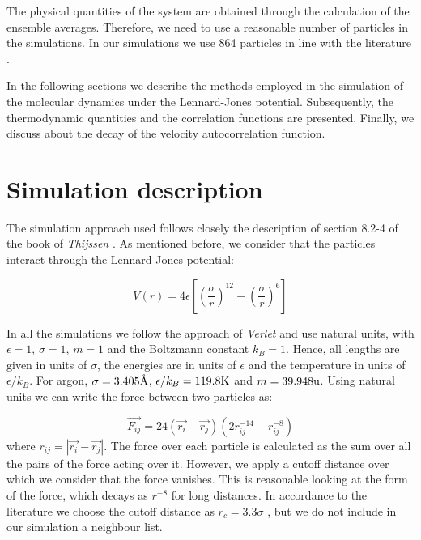 \documentclass[aps,prl,reprint,groupedaddress]{revtex4-1}
\begin{document}
The physical quantities of the system are obtained through the calculation of the ensemble averages. Therefore, we need to use a reasonable number of particles in the simulations. In our simulations we use 864 particles in line with the literature \cite{Verlet1967, Rahman1964}.

In the following sections we describe the methods employed in the simulation of the molecular dynamics under the Lennard-Jones potential. Subsequently, the thermodynamic quantities and the correlation functions are presented. Finally, we discuss about the decay of the velocity autocorrelation function.

\section{Simulation description \label{description}}

The simulation approach used follows closely the description of section 8.2-4 of the book of \textit{Thijssen} \cite{ICCPBook}. As mentioned before, we consider that the particles interact through the Lennard-Jones potential:

\begin{equation}
	V(r) = 4 \epsilon \left[\left(\frac{\sigma}{r} \right)^{12} - \left(\frac{\sigma}{r} \right)^{6} \right]
\end{equation}

In all the simulations we follow the approach of \textit{Verlet} \cite{Verlet1967} and use natural units, with $\epsilon = 1$, $\sigma = 1$, $m = 1$ and the Boltzmann constant $k_B = 1$. Hence, all lengths are given in units of $\sigma$, the energies are in units of $\epsilon$ and the temperature in units of $\epsilon/k_B$. For argon, $\sigma = 3.405 \textup{\AA}$, $\epsilon/k_B = 119.8 \textup{K}$ \cite{Argon} and $m = 39.948 \textup{u}$. Using natural units we can write the force between two particles as:

\begin{equation}\label{force}
	\vec{F_{ij}} = 24 \left( \vec{r_i} - \vec{r_j} \right) \left(2r_{ij}^{-14} - r_{ij}^{-8} \right)
\end{equation}
where $r_{ij} = |\vec{r_i} - \vec{r_j}|$. The force over each particle is calculated as the sum over all the pairs of the force acting over it. However, we apply a cutoff distance over which we consider that the force vanishes. This is reasonable looking at the form of the force, which decays as $r^{-8}$ for long distances. In accordance to the literature we choose the cutoff distance as $r_{c} = 3.3 \sigma$ \cite{Verlet1967, ICCPBook}, but we do not include in our simulation a neighbour list.
\end{document}
